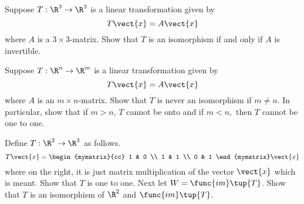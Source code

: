 \begin{enumialphparenastyle}
\begin{ex} Suppose $T:\R^{3}\rightarrow \R^{3}$ is a linear
transformation given by 
\begin{equation*}
T\vect{x}=A\vect{x}
\end{equation*}
where $A$ is a $3\times 3$-matrix. Show that $T$ is an isomorphism if and
only if $A$ is invertible.
\end{ex}


\begin{ex} Suppose $T:\R^{n}\rightarrow \R^{m}$ is a linear
transformation given by 
\begin{equation*}
T\vect{x}=A\vect{x}
\end{equation*}
where $A$ is an $m\times n$-matrix. Show that $T$ is never an isomorphism if 
$m\neq n$. In particular, show that if $m>n$, $T$ cannot be onto and if $
m<n, $ then $T$ cannot be one to one.
\end{ex}


\begin{ex} Define $T:\R^{2}\rightarrow \R^{3}$ as follows. 
\begin{equation*}
T\vect{x}=\begin{mymatrix}{cc}
1 & 0 \\ 
1 & 1 \\ 
0 & 1
\end{mymatrix} \vect{x}
\end{equation*}
where on the right, it is just matrix multiplication of the vector $\vect{x}$
which is meant. Show that $T$ is one to one. Next let $W=\func{im}\tup{
T}$. Show that $T$ is an isomorphism of $\R^{2}$ and $\func{im
}\tup{T}$.
\end{ex}



\end{enumialphparenastyle}
